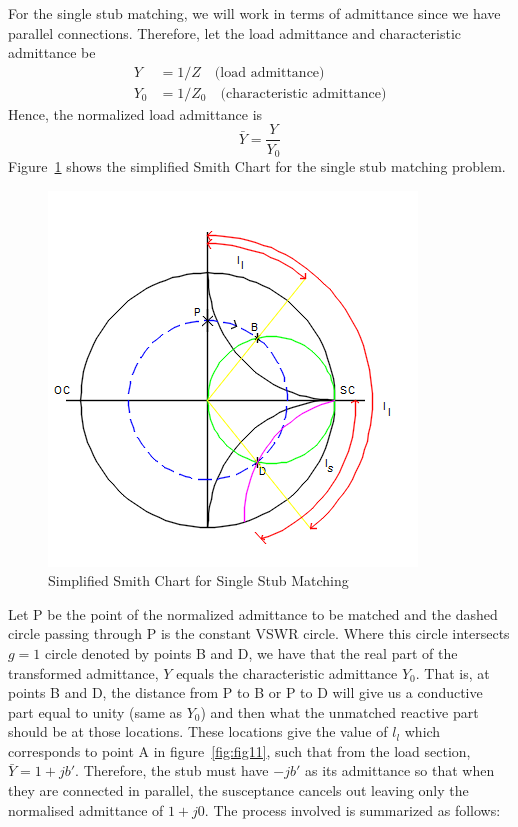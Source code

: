 For the single stub matching, we will work in terms of admittance since we have parallel connections. Therefore, let the load admittance and characteristic admittance be
\begin{align*}
Y &= 1/Z\quad\text{(load admittance)}\\
Y_0 &= 1/Z_0\quad\text{(characteristic admittance)}
\end{align*}
Hence, the normalized load admittance is
\begin{equation*} 
\bar{Y}=\frac{Y}{Y_0} 
\end{equation*}
Figure~\ref{fig:qwtch} shows the simplified Smith Chart for the single stub matching problem.
\begin{figure}[h]
\centering
\includegraphics[width=1\linewidth]{./graphics/qwtch}
\caption{Simplified Smith Chart for Single Stub Matching}
\label{fig:qwtch}
\end{figure}
Let P be the point of the normalized admittance to be matched and the dashed circle passing through P is the constant VSWR circle. Where this circle intersects $g = 1$ circle denoted by points B and D, we have that the real part of the transformed admittance, $Y$ equals the characteristic admittance $Y_0$. That is, at points B and D, the distance from P to B or P to D will give us a conductive part equal to unity (same as $Y_0$) and then what the unmatched reactive part should be at those locations. These locations give the value of $l_l$ which corresponds to point A in figure~\ref{fig:fig11}, such that from the load section, $\bar{Y} = 1 + jb'$. Therefore, the stub must have $-jb'$ as its admittance so that when they are connected in parallel, the susceptance cancels out leaving only the normalised admittance of $1 + j0$. The process involved is summarized as follows:
